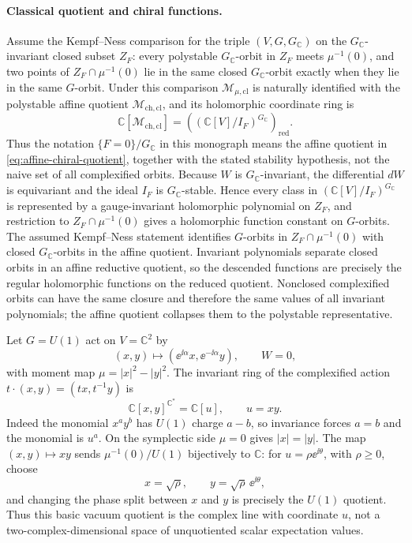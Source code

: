 \paragraph{Classical quotient and chiral functions.}
Assume the Kempf--Ness comparison for the triple
\((V,G,G_\mathbb C)\) on the \(G_\mathbb C\)-invariant closed subset
\(Z_F\): every polystable \(G_\mathbb C\)-orbit in \(Z_F\) meets
\(\mu^{-1}(0)\), and two points of \(Z_F\cap\mu^{-1}(0)\) lie in the same
closed \(G_\mathbb C\)-orbit exactly when they lie in the same \(G\)-orbit.
Under this comparison \(\mathcal M_{\mu,\mathrm{cl}}\) is naturally identified with the
polystable affine quotient \(\mathcal M_{\mathrm{ch},\mathrm{cl}}\), and its
holomorphic coordinate ring is
\[
  \mathbb C[\mathcal M_{\mathrm{ch},\mathrm{cl}}]
  =
  \left((\mathbb C[V]/I_F)^{G_\mathbb C}\right)_{\mathrm{red}} .
\]
Thus the notation \(\{F=0\}/G_\mathbb C\) in this monograph means the affine
quotient in \eqref{eq:affine-chiral-quotient}, together with the stated
stability hypothesis, not the naive set of all complexified orbits.
Because \(W\) is \(G_\mathbb C\)-invariant, the differential \(dW\) is
equivariant and the ideal \(I_F\) is \(G_\mathbb C\)-stable.  Hence every
class in \((\mathbb C[V]/I_F)^{G_\mathbb C}\) is represented by a
gauge-invariant holomorphic polynomial on \(Z_F\), and restriction to
\(Z_F\cap\mu^{-1}(0)\) gives a holomorphic function constant on \(G\)-orbits.
The assumed Kempf--Ness statement identifies \(G\)-orbits in
\(Z_F\cap\mu^{-1}(0)\) with closed \(G_\mathbb C\)-orbits in the affine
quotient.  Invariant polynomials separate closed orbits in an affine
reductive quotient, so the descended functions are precisely the regular
holomorphic functions on the reduced quotient.  Nonclosed complexified orbits
can have the same closure and therefore the same values of all invariant
polynomials; the affine quotient collapses them to the polystable
representative.

\begin{example}
\label{ex:susy-rank-one-abelian-quotient}
Let \(G=U(1)\) act on \(V=\mathbb C^2\) by
\[
  (x,y)\longmapsto(\ee^{\ii\alpha}x,\ee^{-\ii\alpha}y),
  \qquad W=0,
\]
with moment map \(\mu=|x|^2-|y|^2\).  The invariant ring of the
complexified action \(t\cdot(x,y)=(tx,t^{-1}y)\) is
\[
  \mathbb C[x,y]^{\mathbb C^\ast}=\mathbb C[u],
  \qquad u=xy .
\]
Indeed the monomial \(x^ay^b\) has \(U(1)\) charge \(a-b\), so invariance
forces \(a=b\) and the monomial is \(u^a\).  On the symplectic side
\(\mu=0\) gives \(|x|=|y|\).  The map \((x,y)\mapsto xy\) sends
\(\mu^{-1}(0)/U(1)\) bijectively to \(\mathbb C\): for
\(u=\rho\ee^{\ii\theta}\), with \(\rho\ge0\), choose
\[
  x=\sqrt{\rho},\qquad y=\sqrt{\rho}\,\ee^{\ii\theta},
\]
and changing the phase split between \(x\) and \(y\) is precisely the
\(U(1)\) quotient.  Thus this basic vacuum quotient is the complex line with
coordinate \(u\), not a two-complex-dimensional space of unquotiented scalar
expectation values.
\end{example}

